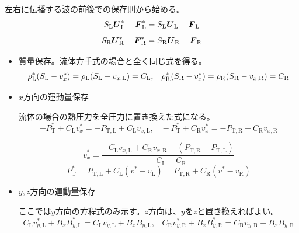 左右に伝播する波の前後での保存則から始める。
\begin{equation}
    S_\mathrm{L} {\mbox{\boldmath $ U$}}^*_\mathrm{L} - {\mbox{\boldmath $ F$}}^*_\mathrm{L}
    = S_\mathrm{L} {\mbox{\boldmath $ U$}}_\mathrm{L} - {\mbox{\boldmath $ F$}}_\mathrm{L}
    \label{hllc_sl}
\end{equation}
\begin{equation}
    S_\mathrm{R} {\mbox{\boldmath $ U$}}^*_\mathrm{R} - {\mbox{\boldmath $ F$}}^*_\mathrm{R}
    = S_\mathrm{R} {\mbox{\boldmath $ U$}}_\mathrm{R} - {\mbox{\boldmath $ F$}}_\mathrm{R}
    \label{hllc_sr}
\end{equation}

\begin{itemize}
\item 質量保存。流体方手式の場合と全く同じ式を得る。
\begin{equation}
 \rho_\mathrm{L}^* (S_\mathrm{L} - v_x^*) = \rho_\mathrm{L} (S_\mathrm{L} - v_{x,\mathrm{L}}) = C_\mathrm{L},\;\;\;
 \rho_\mathrm{R}^* (S_\mathrm{R} - v_x^*) = \rho_\mathrm{R} (S_\mathrm{R} - v_{x,\mathrm{R}}) = C_\mathrm{R}
 \label{hllc_mhd_mass}
\end{equation}

\item $x$方向の運動量保存

流体の場合の熱圧力を全圧力に置き換えた式になる。
\begin{equation}
   - P_\mathrm{T}^* + C_\mathrm{L} v_x^* = 
   - P_\mathrm{T,L} + C_\mathrm{L} v_{x,\mathrm{L}},\;\;\;
   - P_\mathrm{T}^* + C_\mathrm{R} v_x^* = 
   - P_\mathrm{T,R} + C_\mathrm{R} v_{x,\mathrm{R}}
 \label{hllc_mhd_momx}
\end{equation}
\begin{screen}
\begin{equation}
    v_x^* = \frac{ - C_\mathrm{L} v_{x,\mathrm{L}} + C_\mathrm{R} v_{x,\mathrm{R}}
    - (P_\mathrm{T,R} - P_\mathrm{T,L})}{-C_\mathrm{L} + C_\mathrm{R}} 
\end{equation}
\begin{equation}
    P_\mathrm{T}^* = P_\mathrm{T,L} + C_\mathrm{L} (v^* - v_\mathrm{L})
        = P_\mathrm{T,R} + C_\mathrm{R} (v^* - v_\mathrm{R})
\end{equation}
\end{screen}
\item $y,z$方向の運動量保存

ここでは$y$方向の方程式のみ示す。$z$方向は、$y$を$z$と置き換えればよい。
\begin{equation}
    C_\mathrm{L} v_{y,\mathrm{L}}^* + B_x B_{y,\mathrm{L}}^* = 
    C_\mathrm{L} v_{y,\mathrm{L}} + B_x B_{y,\mathrm{L}},\;\;\;
    C_\mathrm{R} v_{y,\mathrm{R}}^* + B_x B_{y,\mathrm{R}}^* = 
    C_\mathrm{R} v_{y,\mathrm{R}} + B_x B_{y,\mathrm{R}}  
    \label{hllc_mhd_momy}
\end{equation}


\end{itemize}
